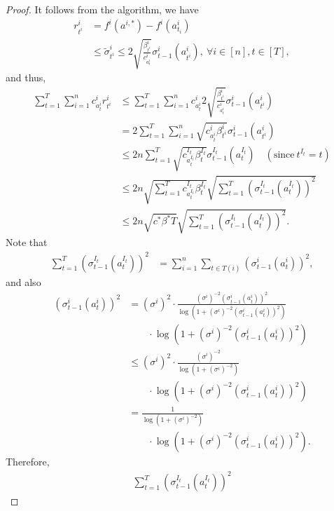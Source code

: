 \documentclass[letterpaper]{vldb}
\begin{document}
\begin{proof}
  It follows from the algorithm, we have
  \begin{align*}
    r^i_{t^i} & = f^i(a^{i,\ast}) - f^i(a^i_{t_i})\\
    & \le \tilde{\sigma}^i_{t^i} \le 2
    \sqrt{\frac{\beta^i_{t^i}}{c^i_{a^i_{t}}}}\sigma^i_{t-1}(a^i_{t^i}),\ \forall
    i\in [n], t\in [T],
  \end{align*}
  and thus,
  \begin{align*}
    \sum_{t=1}^T \sum_{i=1}^n c^i_{a^i_t} r^i_{t^i}
    & \le \sum_{t=1}                                                    ^T \sum_{i=1}^n c^i_{a_t^i} 2 \sqrt{\frac{\beta^i_{t^i}}{c^i_{a^i_{t}}}}\sigma^i_{t-1}(a^i_{t^i})\\
        & = 2  \sum_{t=1}^T \sum_{i=1}^n \sqrt{c^i_{a^i_{t}}\beta^i_{t^i}}\sigma^i_{t-1}(a^i_{t^i})\\
    & \le 2 n \sum_{t=1}^T \sqrt{c^{I_t}_{a^{I_t}_{t}}\beta^{I_t}_{t}} \sigma^{I_t}_{t-1}(a^{I_t}_t) \quad(\text{since}~t^{I_t}=t)\\
    & \le 2n \sqrt{\sum_{t=1}^Tc^{I_t}_{a^{I_t}_{t}}\beta^{I_t}_{t}}\sqrt{\sum_{t=1}^T (\sigma^{I_t}_{t-1}(a^{I_t}_t))^2}\\
    & \le 2n \sqrt{c^\ast\beta^\ast T}\sqrt{\sum_{t=1}^T (\sigma^{I_t}_{t-1}(a^{I_t}_t))^2}.
  \end{align*}
  Note that
  \begin{align*}
    \sum_{t=1}^T (\sigma^{I_t}_{t-1}(a^{I_t}_t))^2
    & = \sum_{i=1}^n \sum_{t\in T(i)} (\sigma^i_{t-1}(a^i_{t}))^2,
  \end{align*}
  and also
  \begin{align*}
    (\sigma^i_{t-1}(a^i_{t}))^2
    & = (\sigma^i)^2\cdot \frac{(\sigma^i)^{-2} (\sigma^i_{t-1}(a^i_{t}))^2}{\log\left(1 + (\sigma^i)^{-2} (\sigma^i_{t-1}(a^i_{t}))^2\right)}\\
    &\qquad \cdot \log\left(1 + (\sigma^i)^{-2} (\sigma^i_{t-1}(a^i_{t}))^2\right)\\
    & \le (\sigma^i)^2 \cdot \frac{(\sigma^i)^{-2}}{\log\left(1 + (\sigma^i)^{-2}\right)}\\
    &\qquad \cdot \log\left(1 + (\sigma^i)^{-2} (\sigma^i_{t-1}(a^i_{t}))^2\right)\\
    & = \frac{1}{\log\left(1 + (\sigma^i)^{-2}\right)}\\   
    &\qquad \cdot \log\left(1 + (\sigma^i)^{-2} (\sigma^i_{t-1}(a^i_{t}))^2\right).
  \end{align*}
  Therefore,
  \begin{align*}
    \sum_{t=1}^T (\sigma^{I_t}_{t-1}(a^{I_t}_t))^2

\end{align*}
\end{proof}
\end{document}
